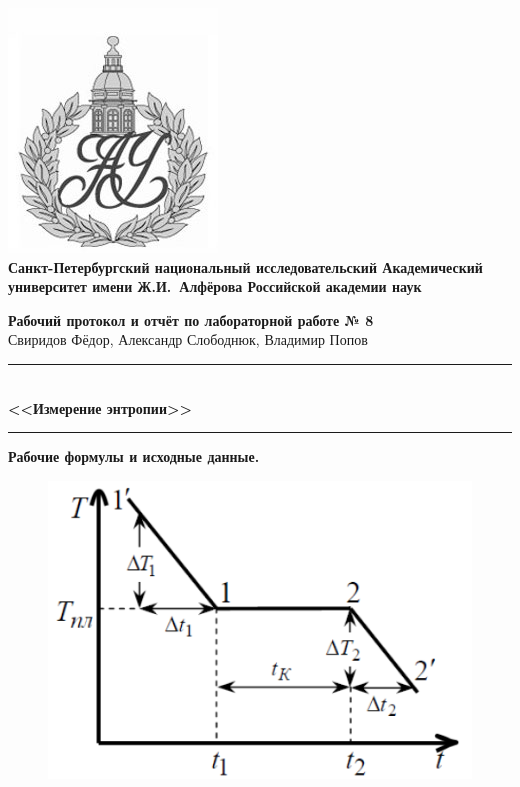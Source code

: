 \documentclass{article}
\begin{document}
\begin{center}
	\includegraphics[scale=0.25]{AU}\\
	{\Large\bfseries Санкт-Петербургский национальный исследовательский Академический университет имени Ж.И.~Алфёрова Российской академии наук}
\end{center}

\begin{center}
	{\large\textbf{Рабочий протокол и отчёт по лабораторной работе № 8}}\\
	Свиридов Фёдор, Александр Слободнюк, Владимир Попов
\end{center}

\begin{center}
	\rule{12cm}{0.4mm}\\
	\large\bfseries{<<Измерение энтропии>>}\\
	\rule{12cm}{0.4mm}
\end{center}
 \textbf{Рабочие формулы и исходные данные.}
 

 	\begin{figure}[htb]
 		
 		 \begin{center}
 	 \includegraphics[scale=0.3]{plot}
 	   \end{center}
    \caption{}
 	\end{figure}
\end{document}
